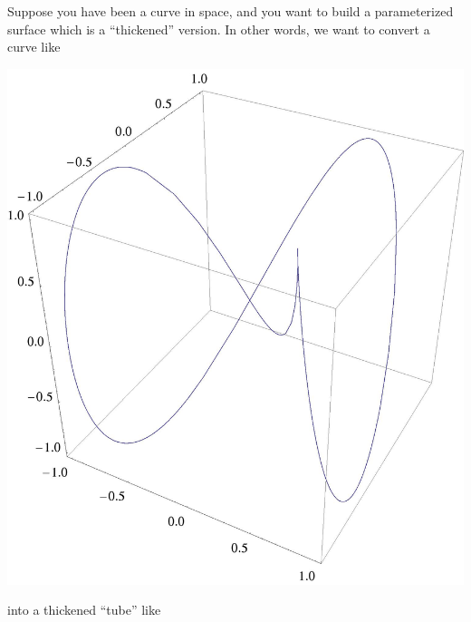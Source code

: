 \documentclass{ximera}
\begin{document}
Suppose you have been a curve in space, and you want to build a
parameterized surface which is a ``thickened'' version.  In other
words, we want to convert a curve like
\begin{image}
  \includegraphics{curve.jpg}
\end{image}
into a thickened ``tube'' like
\end{document}
